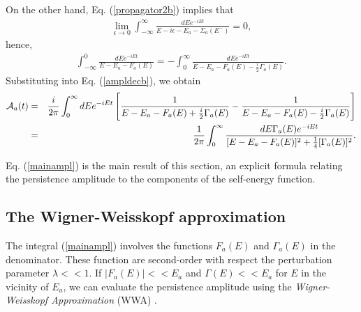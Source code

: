 \documentclass[12pt]{article}
\numberwithin{equation}{section}
\begin{document}
On the other hand, Eq. (\ref{propagator2b}) implies that
\begin{eqnarray}
 \lim_{\epsilon \rightarrow 0} \int_{-\infty }^{\infty } \frac{dE e^{-iEt}}{E - i \epsilon- E_a - \Sigma_a(E^-)} = 0,
\end{eqnarray}
hence,
\begin{eqnarray}
  \int_{-\infty }^{0 } \frac{dE e^{-iEt}}{E -   E_a - F_a(E)}  = -  \int_{0 }^{\infty } \frac{dE e^{-iEt}}{E -   E_a - F_a(E) - \frac{i}{2}  \Gamma_a(E)}.
\end{eqnarray}
Substituting into Eq. (\ref{ampldecb}), we obtain
\begin{eqnarray}
{\cal A}_a(t) &=& \frac{i}{2 \pi  }  \int_{0}^{\infty } dE e^{-iEt} \left[ \frac{1}{E  - E_a - F_a(E) + \frac{i}{2} \Gamma_a(E)} - \frac{1}{E  - E_a - F_a(E) - \frac{i}{2} \Gamma_a(E)}\right] \nonumber \\
&=&  \frac{1}{2 \pi }  \int_{0 }^{\infty } \frac{dE \Gamma_a(E) e^{-iEt}}{ [E - E_a - F_a(E)]^2 + \frac{1}{4}[\Gamma_a(E)]^2}. \label{mainampl}
\end{eqnarray}




Eq. (\ref{mainampl}) is the main result of this section, an explicit formula relating the persistence amplitude to the components of the self-energy function.


\subsection{The Wigner-Weisskopf approximation}

The integral  (\ref{mainampl}) involves the functions $F_a(E)$ and $\Gamma_a(E)$ in the denominator. These function are second-order with respect  the perturbation parameter $\lambda << 1$. If  $|F_a(E)| << E_a$ and $\Gamma(E) << E_a$ for $E$ in the vicinity of $E_a$, we can evaluate the persistence amplitude using the {\em Wigner-Weisskopf Approximation} (WWA) \cite{WWA}.
\end{document}
